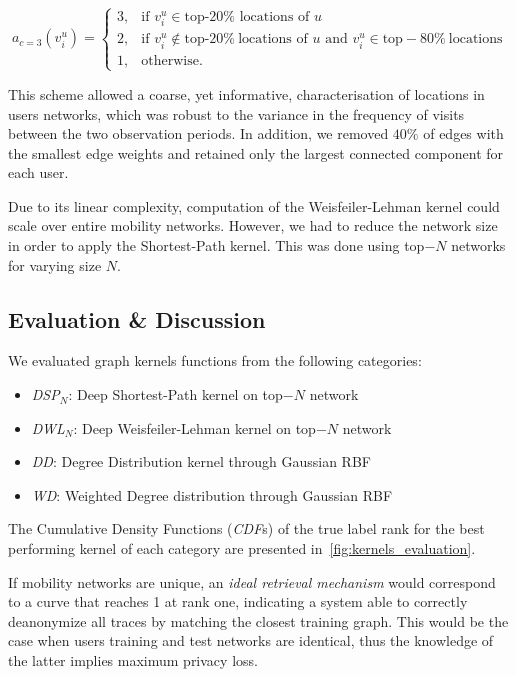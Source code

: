 \begin{equation*}
	a_{c=3}\left(v_i^u\right)=
	\begin{cases}
		 3, &  \mbox{if } v_i^u \in \mbox{top-20\%~locations of } u  \\
		 2, &  \mbox{if } v_i^u  \notin \mbox{top-20}\%~\mbox{locations of }  u   \mbox{ and }  v_i^u \in \mbox{top}-80\%~\mbox{locations}\\
		 1, &  \mbox{otherwise}.
	\end{cases}
\end{equation*}

This scheme allowed a coarse, yet informative, characterisation of locations in users networks, which was robust to the variance in the frequency of visits between the two observation periods. In addition, we removed $40\%$ of edges with the smallest edge weights and retained only the largest connected component for each user.


Due to its linear complexity, computation of the Weisfeiler-Lehman kernel could scale over entire mobility networks.
However, we had to reduce the network size in order to apply the Shortest-Path kernel.
This was done using top$-N$ networks for varying size $N$.



\subsection{Evaluation \& Discussion}

We evaluated graph kernels functions from the following categories:
\begin{itemize}
	\item \emph{DSP}$_{N}$: Deep Shortest-Path kernel on top$-N$ network
	\item \emph{DWL}$_{N}$: Deep Weisfeiler-Lehman kernel on top$-N$ network
	\item \emph{DD}: Degree Distribution kernel through Gaussian RBF
	\item \emph{WD}: Weighted Degree distribution through Gaussian RBF
\end{itemize}
The  Cumulative Density Functions (\emph{CDF}s) of the  true label rank for the best performing kernel of each category are presented in~\cref{fig:kernels_evaluation}.

If mobility networks are unique, an \emph{ideal retrieval mechanism} would correspond to a curve that reaches 1 at rank one, indicating a system able to correctly deanonymize all traces by matching the closest training graph.
This would be the case when users training and test networks are identical, thus the knowledge of the latter implies maximum privacy loss.

